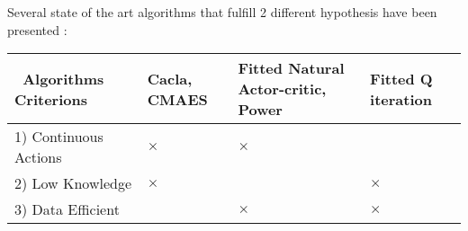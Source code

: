 Several state of the art algorithms that fulfill 2 different hypothesis have been presented :

\begin{tabular}{|p{3.4cm}|>{\centering\arraybackslash}p{1.2cm}|>{\centering\arraybackslash}p{3cm}|>{\centering\arraybackslash}p{1.8cm}|}
 \hline
 ~\mbox{Algorithms} ~ \mbox{Criterions} & Cacla, CMAES & Fitted Natural Actor-critic, Power & Fitted Q iteration \\ \hline
 1) Continuous Actions & $\times$ & $\times$ & \\ \hline
 2) Low Knowledge & $\times$ & & $\times$ \\ \hline
 3) Data Efficient &  & $\times$ & $\times$\\ \hline
\end{tabular}


